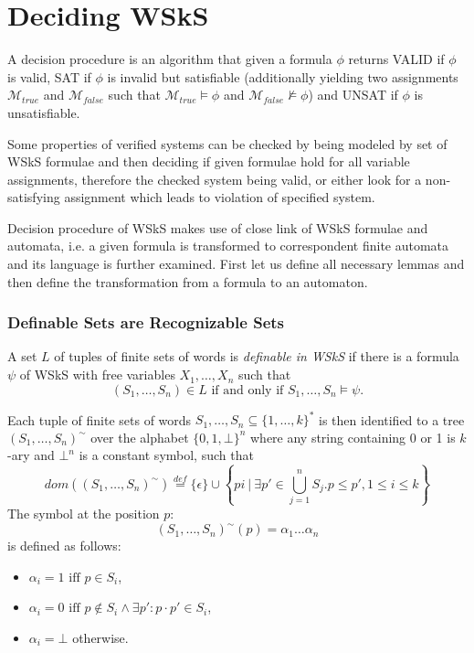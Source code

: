 \section{Deciding WSkS}\label{classical}

A decision procedure is an algorithm that given a formula $\phi$ returns VALID if $\phi$ is valid, SAT if $\phi$ is invalid but satisfiable (additionally yielding two assignments $\mathcal{M}_{true}$ and $\mathcal{M}_{false}$ such that $\mathcal{M}_{true} \vDash \phi$ and $\mathcal{M}_{false} \not\vDash \phi$) and UNSAT if $\phi$ is unsatisfiable.

Some properties of verified systems can be checked by being modeled by set of WSkS formulae and then deciding if given formulae hold for all variable assignments, therefore the checked system being valid, or either look for a non-satisfying assignment which leads to violation of specified system.

Decision procedure of WSkS makes use of close link of WSkS formulae and automata, i.e. a given formula is transformed to correspondent finite automata and its language is further examined. First let us define all necessary lemmas and then define the transformation from a formula to an automaton.

 \subsubsection{Definable Sets are Recognizable Sets}
\begin{defz}
 A set $L$ of tuples of finite sets of words is \emph{definable in WSkS} if there is a formula $\psi$ of WSkS with free variables $X_1,\ldots,X_n$ such that $$(S_1,\ldots,S_n) \in L \text{ if and only if } S_1,\ldots,S_n \vDash \psi.$$
\end{defz}

Each tuple of finite sets of words $S_1,\ldots,S_n \subseteq \{1,\ldots,k\}^*$
is then identified to a tree $(S_1,\ldots,S_n)^\sim$ over the alphabet
$\{0,1,\bot\}^n$ where any string containing 0 or 1 is $k$-ary and $\bot^n$ is a constant symbol, such that
 \begin{equation}
  dom((S_1,\ldots,S_n)^\sim) \overset{def}{=} \{\epsilon\} \cup \left\{ pi\ |\ \exists p' \in \bigcup_{j = 1}^n S_j.p \leq p', 1 \leq i \leq k\right\}
 \end{equation}
The symbol at the position $p$: $$(S_1,\ldots,S_n)^\sim(p) = \alpha_1\ldots\alpha_n$$ is defined as follows:
 \begin{itemize}
  \item $\alpha_i = 1 \text{ iff } p \in S_i$,
  \item $\alpha_i = 0 \text{ iff } p \notin S_i \wedge \exists p': p\cdot p' \in S_i$,
  \item $\alpha_i = \bot$ otherwise.
 \end{itemize}
 
